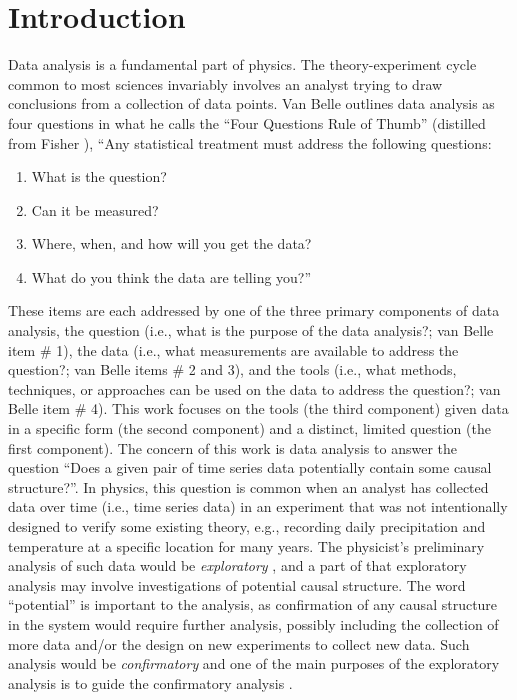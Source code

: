 \documentclass{article}[10pt]
\begin{document}
\section{Introduction} 
Data analysis is a fundamental part of physics.  The theory-experiment cycle common to most sciences \cite{Godfrey2009} invariably involves an analyst trying to draw conclusions from a collection of data points.  Van Belle outlines data analysis as four questions in what he calls the ``Four Questions Rule of Thumb'' \cite{Van2011} (distilled from Fisher \cite{Fisher1960}),  ``Any statistical treatment must address the following questions:
\begin{enumerate}
\item What is the question?
\item Can it be measured?
\item Where, when, and how will you get the data?
\item What do you think the data are telling you?''
\end{enumerate}
These items are each addressed by one of the three primary components of data analysis, the question (i.e., what is the purpose of the data analysis?; van Belle item \# 1), the data (i.e., what measurements are available to address the question?; van Belle items \# 2 and 3), and the tools (i.e., what methods, techniques, or approaches can be used on the data to address the question?; van Belle item \# 4).  This work focuses on the tools (the third component) given data in a specific form (the second component) and a distinct, limited question (the first component).  The concern of this work is data analysis to answer the question ``Does a given pair of time series data potentially contain some causal structure?''.  In physics, this question is common when an analyst has collected data over time (i.e., time series data) in an experiment that was not intentionally designed to verify some existing theory, e.g., recording daily precipitation and temperature at a specific location for many years.  The physicist's preliminary analysis of such data would be {\em exploratory} \cite{Tukey1977}, and a part of that exploratory analysis may involve investigations of potential causal structure.  The word ``potential'' is important to the analysis, as confirmation of any causal structure in the system would require further analysis, possibly including the collection of more data and/or the design on new experiments to collect new data.  Such analysis would be {\em confirmatory} and one of the main purposes of the exploratory analysis is to guide the confirmatory analysis \cite{Tukey1977}.
\end{document}
